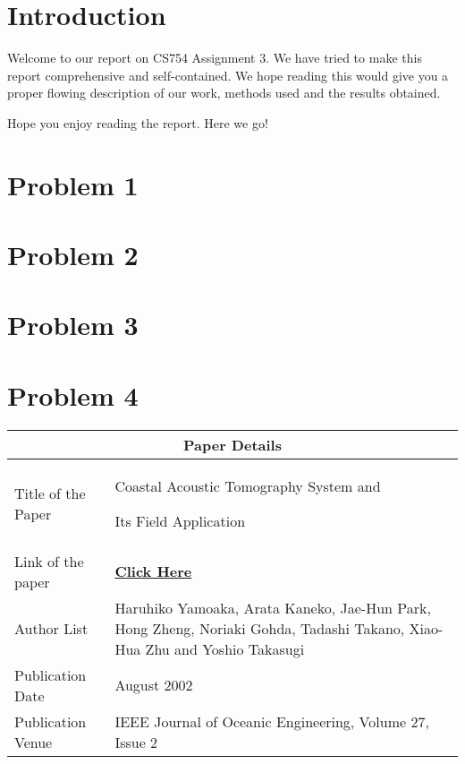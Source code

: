 \documentclass[a4paper,11pt]{article}
\numberwithin{definition}{section}
\numberwithin{mytheorem}{subsection}
\begin{document}

\date{Spring 2022}
\maketitle

\justifying
\tableofcontents

\newpage
\justifying
\section*{Introduction}

Welcome  to our report on CS754 Assignment 3. We have tried to make this report comprehensive and self-contained. We hope reading this would give you a proper flowing description of our work, methods used and the results obtained.

Hope you enjoy reading the report. Here we go!


\section{Problem 1}


\section{Problem 2}


\section{Problem 3}


\section{Problem 4}


\begin{center}
    \begin{tabular}{ |p{3.5cm}||p{10cm}|}
   
    \hline
    \multicolumn{2}{|c|}{Paper Details} \\
    \hline
    Title of the Paper& Coastal Acoustic Tomography System and 
    
    Its Field Application\\
    \hline
    Link of the paper  &  \href{https://ieeexplore.ieee.org/document/1002483}{\textbf{Click Here}}  \\
    \hline
    Author List & Haruhiko Yamoaka, Arata Kaneko, Jae-Hun Park, Hong Zheng, Noriaki Gohda, Tadashi Takano, Xiao-Hua Zhu and Yoshio Takasugi \\
    \hline
    Publication Date  & August 2002 \\
    \hline
    Publication Venue  &  IEEE Journal of Oceanic Engineering, Volume 27, Issue 2 \\
    \hline
   \end{tabular}
\end{center}
\end{document}
